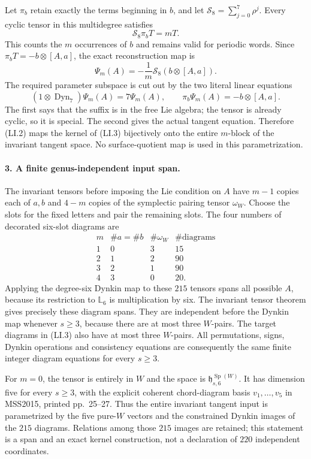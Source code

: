 Let $\pi_b$ retain exactly the terms beginning in $b$, and
let $\mathcal S_8=\sum_{j=0}^7\rho^j$. Every cyclic tensor
in this multidegree satisfies
\[
                  \mathcal S_8\pi_b T=mT.
\]
This counts the $m$ occurrences of $b$ and remains valid
for periodic words. Since $\pi_bT=-b\otimes[A,a]$, the
exact reconstruction map is
\[
 \Psi_m(A)=-\frac1m\mathcal S_8(b\otimes[A,a]).             \tag{LI.2}
\]
The required parameter subspace is cut out by the two
literal linear equations
\[
 (1\otimes\operatorname{Dyn}_7)\Psi_m(A)=7\Psi_m(A),
          \qquad \pi_b\Psi_m(A)=-b\otimes[A,a].            \tag{LI.3}
\]
The first says that the suffix is in the free Lie algebra;
the tensor is already cyclic, so it is special. The second
gives the actual tangent equation. Therefore (LI.2) maps
the kernel of (LI.3) bijectively onto the entire $m$-block
of the invariant tangent space. No surface-quotient map
is used in this parametrization.

\paragraph{3. A finite genus-independent input span.}
The invariant tensors before imposing the Lie condition on
$A$ have $m-1$ copies each of $a,b$ and $4-m$ copies of the
symplectic pairing tensor $\omega_W$. Choose the slots for
the fixed letters and pair the remaining slots. The four
numbers of decorated six-slot diagrams are
\[
 \begin{array}{c|r|r|r}
 m&\#a=\#b&\#\omega_W&\#\text{diagrams}\\\hline
 1&0&3&15\\
 2&1&2&90\\
 3&2&1&90\\
 4&3&0&20.
 \end{array}                                                \tag{LI.4}
\]
Applying the degree-six Dynkin map to these $215$ tensors
spans all possible $A$, because its restriction to
$\mathbb L_6$ is multiplication by six. The invariant
tensor theorem gives precisely these diagram spans. They
are independent before the Dynkin map whenever $s\geq3$,
because there are at most three $W$-pairs. The target
diagrams in (LI.3) also have at most three $W$-pairs.
All permutations, signs, Dynkin operations and consistency
equations are consequently the same finite integer
diagram equations for every $s\geq3$.

For $m=0$, the tensor is entirely in $W$ and the space is
$\mathfrak h_{s,6}^{\operatorname{Sp}(W)}$. It has dimension
five for every $s\geq3$, with the explicit coherent
chord-diagram basis $v_1,\ldots,v_5$ in MSS2015,
printed pp.~25--27. Thus the entire invariant tangent
input is parametrized by the five pure-$W$ vectors and
the constrained Dynkin images of the $215$ diagrams.
Relations among those $215$ images are retained; this
statement is a span and an exact kernel construction,
not a declaration of $220$ independent coordinates.

